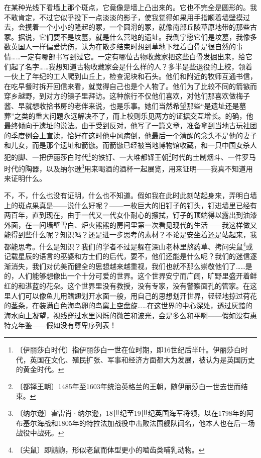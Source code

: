 \documentclass[12pt,UTF-8,openany]{ctexbook}
\begin{document}
\begin{normalsize}
    在某种光线下看墙上那个斑点，它竟像是墙上凸出来的。它也不完全是圆形的。我不敢肯定，不过它似乎投下一点淡淡的影子，使我觉得如果用手指顺着墙壁摸过去，会摸着一个小小的隆起的冢，一个圆滑的冢，就像南部丘陵草原地带的那些古冢。据说，它们要不是坟墓，就是什么营地的遗址。我倒宁愿它们是坟墓，我像多数英国人一样偏爱忧伤，认为在散步结束时想到草地下埋着白骨是很自然的事情……一定有哪部书写到过它。一定有哪位古物收藏家把这些白骨发掘出来，给它们起了名字……我想知道古物收藏家会是什么样的人？多半是些退役的上校，领着一伙上了年纪的工人爬到山丘上，检查泥块和石头。他们和附近的牧师互通书信，在吃早餐时拆开回信来看，就觉得自己也是个人物了。他们为了比较不同的箭镞而穿乡越野，到对方的镇子里拜访。这种旅行不仅他们喜欢，对他们那喜欢做梅子酱、早就想收拾书房的老伴来说，也是乐事。她们当然希望那些“是遗址还是墓葬”之类的重大问题永远解决不了，而上校则乐见两方的证据交互增长。的确，他最终倾向于遗址的说法。由于受到反对，他写了一篇文章，准备拿到当地古玩社团的季度例会上宣读，恰好在这时他中风病倒，他最后一个清醒的念头不是他的妻子和儿女，而是那个遗址和箭镞。而箭镞已经被当地博物馆收藏，和一只中国女杀人犯的脚、一把伊丽莎白时代\footnote{〔伊丽莎白时代〕指伊丽莎白一世在位时期，即16世纪后半叶。伊丽莎白时代，英国在文化、殖民扩张、军事和经济方面都大为发展，被认为是英国历史的黄金时代。}的铁钉、一大堆都铎王朝\footnote{〔都铎王朝〕1485年至1603年统治英格兰的王朝，随伊丽莎白一世去世而结束。}时代的土制烟斗、一件罗马时代的陶器，以及纳尔逊\footnote{〔纳尔逊〕霍雷肖·纳尔逊，18世纪至19世纪英国海军将领，以在1798年的阿布基尔海战和1805年的特拉法加战役中击败法国舰队闻名，他本人也在后一场战役中战死。}用来喝酒的酒杯一起展览，用来证明——我真不知道用来证明什么。
    
    不，不，什么也没有证明，什么也不知道。假如我在此时此刻站起身来，弄明白墙上的斑点果真是——说什么好呢？——一枚巨大的旧钉子的钉头，钉进墙里已经有两百年，直到现在，由于一代又一代女仆耐心的擦拭，钉子的顶端得以露出到油漆外面，在一间墙壁雪白、炉火熊熊的房间里第一次看见现代的生活——我这样做又能得到些什么呢？知识吗？还是进一步思考的素材？不论是安坐着还是站起来，我都能思考。什么是知识？我们的学者不过是躲在深山老林里熬药草、拷问尖鼠\footnote{〔尖鼠〕即鼱鼩，形似老鼠而体型更小的啮齿类哺乳动物。}或记载星辰的语言的巫婆和方士们的后代，要不，他们还能是什么呢？我们的迷信逐渐消失，我们对优美而健全的思想越来越重视，我们也就不那么崇敬他们了……是的，人们能够想像出一个十分可爱的世界。这个世界安宁而广阔，旷野里盛开着鲜红的和湛蓝的花朵。这个世界里没有教授，没有专家，没有警察面孔的管家。在这里人们可以像鱼儿用鳍翅划开水面一般，用自己的思想划开世界，轻轻地掠过荷花的茎条，在装满白色海鸟卵的鸟窠上空盘旋……在这世界的中心深处，透过灰黯的海水向上凝望，视线穿过水里闪烁的微芒和波光，会是多么和平啊——假如没有惠特克年鉴——假如没有尊卑序列表！
    

\end{normalsize}
\end{document}

